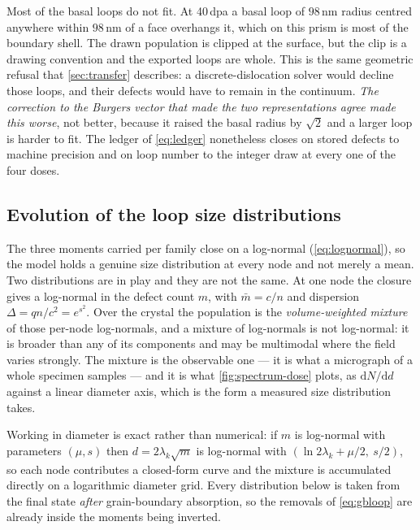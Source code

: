 Most of the basal loops do not fit. At 40\,dpa a basal loop of $98\,$nm radius
centred anywhere within $98\,$nm of a face overhangs it, which on this prism is
most of the boundary shell. The drawn population is clipped at the surface, but
the clip is a drawing convention and the exported loops are whole. This is the
same geometric refusal that \cref{sec:transfer} describes: a
discrete-dislocation solver would decline those loops, and their defects would
have to remain in the continuum. \emph{The correction to the \cloop{} Burgers
vector that made the two representations agree made this worse}, not better,
because it raised the basal radius by $\sqrt2$ and a larger loop is harder to
fit. The ledger of \cref{eq:ledger} nonetheless closes on stored defects to
machine precision and on loop number to the integer draw at every one of the
four doses.

\subsection{Evolution of the loop size distributions}
\label{sec:results-spectrum}

The three moments carried per family close on a log-normal
(\cref{eq:lognormal}), so the model holds a genuine size distribution at every
node and not merely a mean. Two distributions are in play and they are not the
same. At one node the closure gives a log-normal in the defect count $m$, with
$\bar m=c/n$ and dispersion $\Delta=qn/c^{2}=e^{s^{2}}$. Over the crystal the
population is the \emph{volume-weighted mixture} of those per-node log-normals,
and a mixture of log-normals is not log-normal: it is broader than any of its
components and may be multimodal where the field varies strongly. The mixture is
the observable one --- it is what a micrograph of a whole specimen samples ---
and it is what \cref{fig:spectrum-dose} plots, as $\mathrm{d}N/\mathrm{d}d$
against a linear diameter axis, which is the form a measured size distribution
takes.

Working in diameter is exact rather than numerical: if $m$ is log-normal with
parameters $(\mu,s)$ then $d=2\lambda_k\sqrt m$ is log-normal with
$(\ln 2\lambda_k+\mu/2,\ s/2)$, so each node contributes a closed-form curve and
the mixture is accumulated directly on a logarithmic diameter grid. Every
distribution below is taken from the final state \emph{after} grain-boundary
absorption, so the removals of \cref{eq:gbloop} are already inside the moments
being inverted.

